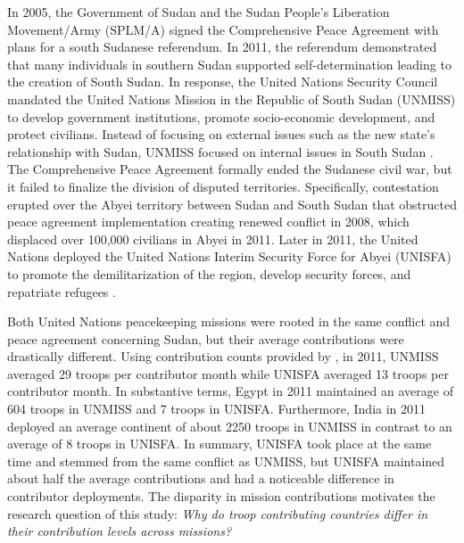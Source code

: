 \documentclass[12pt]{article}
\begin{document}
In 2005, the Government of Sudan and the Sudan People's Liberation Movement/Army (SPLM/A) signed the Comprehensive Peace Agreement with plans for a south Sudanese referendum. In 2011, the referendum demonstrated that many individuals in southern Sudan supported self-determination leading to the creation of South Sudan. In response, the United Nations Security Council mandated the United Nations Mission in the Republic of South Sudan (UNMISS) to develop government institutions, promote socio-economic development, and protect civilians. Instead of focusing on external issues such as the new state's relationship with Sudan, UNMISS focused on internal issues in South Sudan \citep{PKO_UNMISS}. The Comprehensive Peace Agreement formally ended the Sudanese civil war, but it failed to finalize the division of disputed territories. Specifically, contestation erupted over the Abyei territory between Sudan and South Sudan that obstructed peace agreement implementation creating renewed conflict in 2008, which displaced over 100,000 civilians in Abyei in 2011. Later in 2011, the United Nations deployed the United Nations Interim Security Force for Abyei (UNISFA) to promote the demilitarization of the region, develop security forces, and repatriate refugees \citep{PKO_UNISFA}. 


Both United Nations peacekeeping missions were rooted in the same conflict and peace agreement concerning Sudan, but their average contributions were drastically different. Using contribution counts provided by \cite{perry2013}, in 2011, UNMISS averaged 29 troops per contributor month while UNISFA averaged 13 troops per contributor month. In substantive terms, Egypt in 2011 maintained an average of 604 troops in UNMISS and 7 troops in UNISFA. Furthermore, India in 2011 deployed an average continent of about 2250 troops in UNMISS in contrast to an average of 8 troops in UNISFA. In summary, UNISFA took place at the same time and stemmed from the same conflict as UNMISS, but UNISFA maintained about half the average contributions and had a noticeable difference in contributor deployments. The disparity in mission contributions motivates the research question of this study: \textit{Why do troop contributing countries differ in their contribution levels across missions?} 
\end{document}
